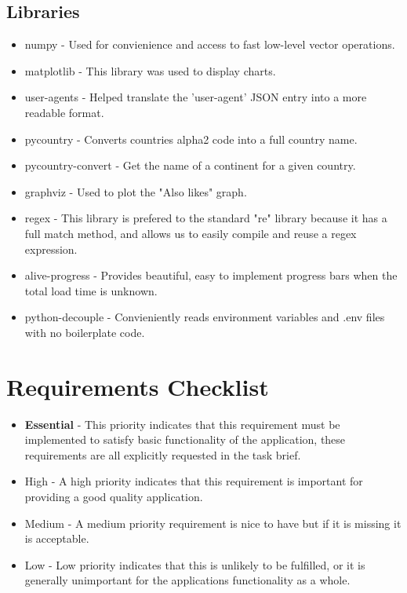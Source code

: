 \documentclass[11pt]{article}
\begin{document}
\subsection{Libraries}
\begin{itemize}
    \item numpy - Used for convienience and access to fast low-level vector operations.
    \item matplotlib - This library was used to display charts.
    \item user-agents - Helped translate the 'user-agent' JSON entry into a more readable format.
    \item pycountry - Converts countries alpha2 code into a full country name.
    \item pycountry-convert - Get the name of a continent for a given country.
    \item graphviz - Used to plot the "Also likes" graph.
    \item regex - This library is prefered to the standard "re" library because it has a full match method, and allows us to easily compile and reuse a regex expression.
    \item alive-progress - Provides beautiful, easy to implement progress bars when the total load time is unknown.
    \item python-decouple - Convieniently reads environment variables and .env files with no boilerplate code.
\end{itemize}


\section{Requirements Checklist}

\begin{itemize}
    \item \textbf{Essential} - This priority indicates that this requirement must be implemented to satisfy basic functionality of the application, these requirements are all explicitly requested in the task brief.
    \item High - A high priority indicates that this requirement is important for providing a good quality application.
    \item Medium - A medium priority requirement is nice to have but if it is missing it is acceptable.
    \item Low - Low priority indicates that this is unlikely to be fulfilled, or it is generally unimportant for the applications functionality as a whole.
\end{itemize}
\end{document}
